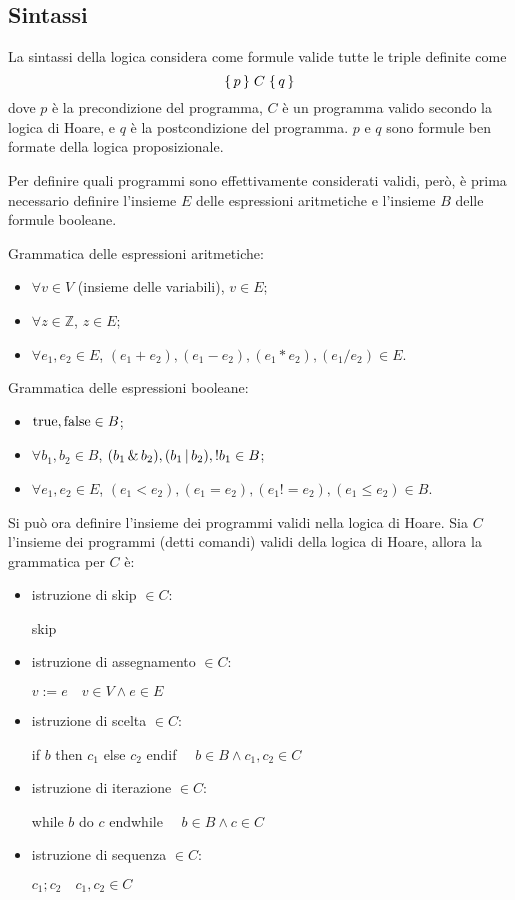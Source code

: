 \subsection*{Sintassi}
La sintassi della logica considera come formule valide tutte le triple
definite come
\[
    \Hoaretriple{p}{C}{q}
\]
dove $p$ è la precondizione del programma,
$C$ è un programma valido secondo la logica di Hoare, e $q$ è la postcondizione
del programma. $p$ e $q$ sono formule ben formate della logica proposizionale.

Per definire quali programmi sono effettivamente considerati validi, però,
è prima necessario definire l'insieme $E$ delle espressioni aritmetiche
e l'insieme $B$ delle formule booleane.

Grammatica delle espressioni aritmetiche:
\begin{itemize}
    \item $\forall v \in V$ (insieme delle variabili), $v \in E$;
    \item $\forall z \in \mathbb{Z}$, $z \in E$;
    \item $\forall e_1, e_2 \in E$, $(e_1+e_2), (e_1-e_2), (e_1*e_2), (e_1/e_2) \in E$.
\end{itemize}
Grammatica delle espressioni booleane:
\begin{itemize}
    \item $\textnormal{true}, \textnormal{false} \in B$;
    \item $\forall b_1, b_2 \in B$, $(b_1 \,\&\, b_2), (b_1 \,|\, b_2), ! b_1 \in B$;
    \item $\forall e_1, e_2 \in E$, $(e_1 < e_2), (e_1 = e_2), (e_1 != e_2), (e_1 \le e_2) \in B$.
\end{itemize}

Si può ora definire l'insieme dei programmi validi nella logica di Hoare.
Sia $C$ l'insieme dei programmi (detti comandi) validi della logica di Hoare,
allora la grammatica per $C$ è:
\begin{itemize}
    \item istruzione di skip $\in C$:
    \begin{center}
        skip
    \end{center}
    \item istruzione di assegnamento $\in C$:
    \begin{center}
        $v:=e \quad v \in V \land e \in E$
    \end{center}
    \item istruzione di scelta $\in C$:
    \begin{center}
        if $b$ then $c_1$ else $c_2$ endif $\quad b \in B \land c_1, c_2 \in C$
    \end{center}
    \item istruzione di iterazione $\in C$:
    \begin{center}
        while $b$ do $c$ endwhile $\quad b \in B \land c \in C$
    \end{center}
    \item istruzione di sequenza $\in C$:
    \begin{center}
        $c_1 ; c_2 \quad c_1, c_2 \in C$
    \end{center}
\end{itemize}

